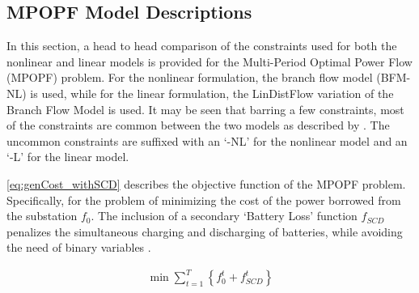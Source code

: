 \documentclass[../../outputs/main.tex]{subfiles}
\begin{document}
\subsection{MPOPF Model Descriptions}
In this section, a head to head comparison of the constraints used for both the nonlinear and linear models is provided for the Multi-Period Optimal Power Flow (MPOPF) problem. For the nonlinear formulation, the branch flow model (BFM-NL) \cite{Farivar1} is used, while for the linear formulation, the LinDistFlow variation of the Branch Flow Model \cite{Farivar} is used. It may be seen that barring a few constraints, most of the constraints are common between the two models as described by . The uncommon constraints are suffixed with an `-NL' for the nonlinear model and an `-L' for the linear model.

\cref{eq:genCost_withSCD} describes the objective function of the MPOPF problem. Specifically, for the problem of minimizing the cost of the power borrowed from the substation $f_0$. The inclusion of a secondary `Battery Loss' function $f_{SCD}$ penalizes the simultaneous charging and discharging of batteries, while avoiding the need of binary variables \cite{Nazir2021Sep}. 

\begin{align}
    \min \sum_{t = 1}^{T} \left\{ f_0^t + f_{SCD}^t \right\}
    \label{eq:genCost_withSCD}
\end{align}
\end{document}
